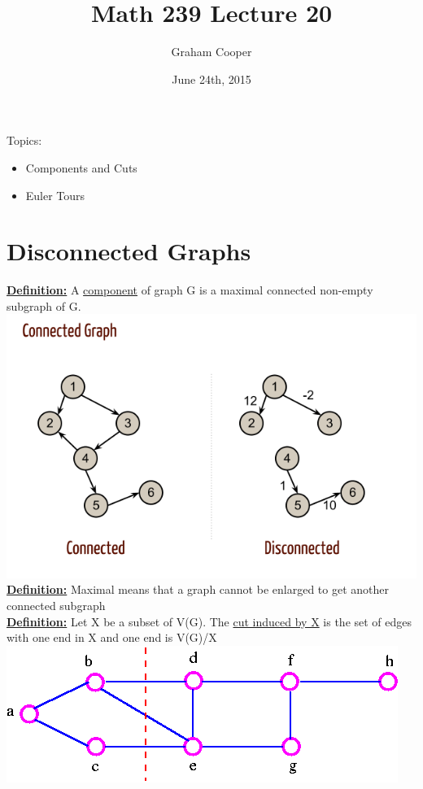 \documentclass[12pt]{article}
\title{\vspace{-15ex}Math 239 Lecture 20\vspace{-1ex}}
\date{June 24th, 2015}
\author{Graham Cooper}
\newcommand{\myt}[1]{\textbf{\underline{#1}}}
\begin{document}
	\maketitle
	
	Topics:\\
	\begin{itemize}
		\item Components and Cuts
		\item Euler Tours
	\end{itemize}
	
	\section*{Disconnected Graphs}
	\myt{Definition:} A \underline{component} of graph G is a maximal connected non-empty subgraph of G.\\
	\includegraphics[scale=0.3]{connectedgraph.png}\\
	\myt{Definition:} Maximal means that a graph cannot be enlarged to get another connected subgraph\\
	
	\myt{Definition:} Let X be a subset of V(G). The \underline{cut induced by X} is the set of edges with one end in X and one end is V(G)/X\\
	
	\includegraphics[scale=0.5]{cut.png}
	
\end{document}
